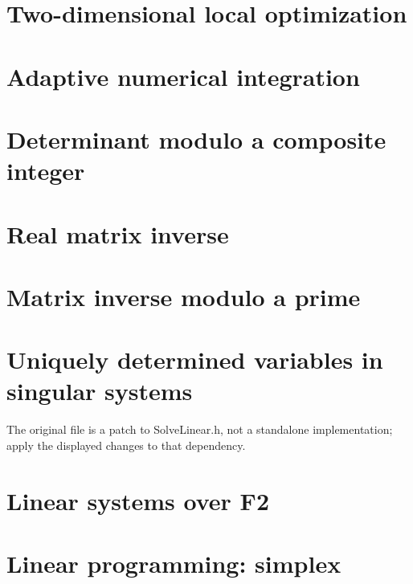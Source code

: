 \section{Two-dimensional local optimization}

\section{Adaptive numerical integration}

\section{Determinant modulo a composite integer}

\section{Real matrix inverse}

\section{Matrix inverse modulo a prime}

\section{Uniquely determined variables in singular systems}
The original file is a patch to SolveLinear.h, not a standalone implementation; apply the displayed changes to that dependency.

\section{Linear systems over F2}

\section{Linear programming: simplex}

